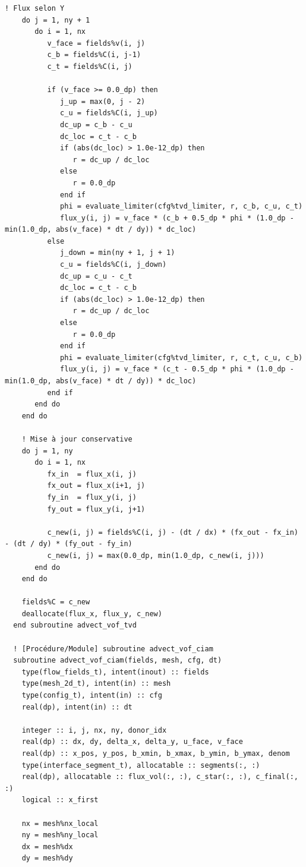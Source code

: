 \documentclass[10pt,a4paper,oneside]{book}
\begin{document}
\begin{lstlisting}[language={[95]Fortran}]
    ! Flux selon Y
    do j = 1, ny + 1
       do i = 1, nx
          v_face = fields%v(i, j)
          c_b = fields%C(i, j-1)
          c_t = fields%C(i, j)

          if (v_face >= 0.0_dp) then
             j_up = max(0, j - 2)
             c_u = fields%C(i, j_up)
             dc_up = c_b - c_u
             dc_loc = c_t - c_b
             if (abs(dc_loc) > 1.0e-12_dp) then
                r = dc_up / dc_loc
             else
                r = 0.0_dp
             end if
             phi = evaluate_limiter(cfg%tvd_limiter, r, c_b, c_u, c_t)
             flux_y(i, j) = v_face * (c_b + 0.5_dp * phi * (1.0_dp - min(1.0_dp, abs(v_face) * dt / dy)) * dc_loc)
          else
             j_down = min(ny + 1, j + 1)
             c_u = fields%C(i, j_down)
             dc_up = c_u - c_t
             dc_loc = c_t - c_b
             if (abs(dc_loc) > 1.0e-12_dp) then
                r = dc_up / dc_loc
             else
                r = 0.0_dp
             end if
             phi = evaluate_limiter(cfg%tvd_limiter, r, c_t, c_u, c_b)
             flux_y(i, j) = v_face * (c_t - 0.5_dp * phi * (1.0_dp - min(1.0_dp, abs(v_face) * dt / dy)) * dc_loc)
          end if
       end do
    end do

    ! Mise à jour conservative
    do j = 1, ny
       do i = 1, nx
          fx_in  = flux_x(i, j)
          fx_out = flux_x(i+1, j)
          fy_in  = flux_y(i, j)
          fy_out = flux_y(i, j+1)

          c_new(i, j) = fields%C(i, j) - (dt / dx) * (fx_out - fx_in) - (dt / dy) * (fy_out - fy_in)
          c_new(i, j) = max(0.0_dp, min(1.0_dp, c_new(i, j)))
       end do
    end do

    fields%C = c_new
    deallocate(flux_x, flux_y, c_new)
  end subroutine advect_vof_tvd

  ! [Procédure/Module] subroutine advect_vof_ciam
  subroutine advect_vof_ciam(fields, mesh, cfg, dt)
    type(flow_fields_t), intent(inout) :: fields
    type(mesh_2d_t), intent(in) :: mesh
    type(config_t), intent(in) :: cfg
    real(dp), intent(in) :: dt

    integer :: i, j, nx, ny, donor_idx
    real(dp) :: dx, dy, delta_x, delta_y, u_face, v_face
    real(dp) :: x_pos, y_pos, b_xmin, b_xmax, b_ymin, b_ymax, denom
    type(interface_segment_t), allocatable :: segments(:, :)
    real(dp), allocatable :: flux_vol(:, :), c_star(:, :), c_final(:, :)
    logical :: x_first

    nx = mesh%nx_local
    ny = mesh%ny_local
    dx = mesh%dx
    dy = mesh%dy


\end{lstlisting}
\end{document}
